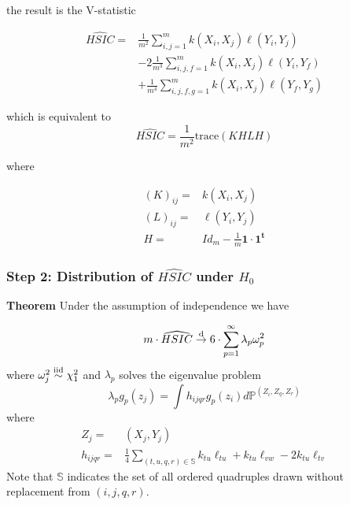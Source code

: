 \clearpage

the result is the V-statistic

\begin{align*}
\widehat{HSIC} = & \frac{1}{m^2} \sum^{m}_{i,j=1} k(X_i,X_j) \ell (Y_i, Y_j) \\
& - 2\frac{1}{m^3}\sum^{m}_{i,j,f=1} k(X_i,X_j) \ell (Y_i, Y_f)  \\ & + \frac{1}{m^4}\sum^{m}_{i,j,f,g=1} k(X_i,X_j) \ell (Y_f, Y_g)
\end{align*}

\clearpage

which is equivalent to 
\begin{equation*}
\widehat{HSIC} = \frac{1}{m^2} \mbox{trace} (KHLH)
\end{equation*}

where

\begin{align*}
(K)_{ij} = & k(X_i, X_j) \\
(L)_{ij} = & \ell (Y_i,Y_j)  \\
H= & Id_m - \frac{1}{m}\mathbf{1}\cdot \mathbf{1^t}
\end{align*}


\clearpage

\subsubsection{Step 2: Distribution of $\widehat{HSIC}$ under $H_0$}

\textbf{Theorem} Under the assumption of independence we have

\begin{equation*}
m\cdot\widehat{HSIC} \overset{\text{\scriptsize d}}{\rightarrow} 6\cdot \sum^{\infty}_{p=1} \lambda_p \omega_p^2
\end{equation*}
where $\omega_j^2 \overset{\text{\scriptsize iid}}{\sim}  \chi_1^2$ and $\lambda_p$ solves the eigenvalue problem
\begin{equation*}
\lambda_p g_p(z_j) = \int h_{ijqr} g_p(z_i) d\mathbb{P}^{(Z_i, Z_q, Z_r)}
\end{equation*}
where 
\begin{align*}
Z_j= &(X_j,Y_j) \\
h_{ijqr}= &\frac{1}{4\!}\sum_{(t,u,q,r)\in\mathbb{S}}k_{tu}\ell_{tu} + k_{tu}\ell_{vw}-2k_{tu}\ell_{tv}
\end{align*}
Note that $\mathbb{S}$ indicates the set of all ordered quadruples drawn without replacement from $(i,j,q,r)$.
\clearpage

